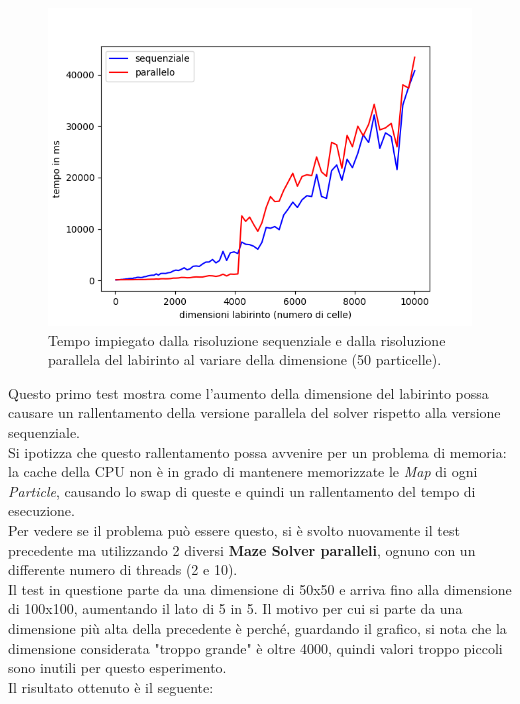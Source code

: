 \documentclass[10pt,twocolumn,letterpaper]{article}
\begin{document}
\begin{figure}[H]
\includegraphics[width=1.1\linewidth]{test/dimTest/result.png}
\caption{\small Tempo impiegato dalla risoluzione sequenziale e dalla risoluzione parallela del labirinto al variare della dimensione (50 particelle).}
\label{t1}
\end{figure}

Questo primo test mostra come l'aumento della dimensione del labirinto possa causare un rallentamento della versione parallela del solver rispetto alla versione sequenziale.\\
Si ipotizza che questo rallentamento possa avvenire per un problema di memoria: la cache della CPU non è in grado di mantenere memorizzate le \textit{Map} di ogni \textit{Particle}, causando lo swap di queste e quindi un rallentamento del tempo di esecuzione.\\
Per vedere se il problema può essere questo, si è svolto nuovamente il test precedente ma utilizzando 2 diversi \textbf{Maze Solver paralleli}, ognuno con un differente numero di threads (2 e 10).\\
Il test in questione parte da una dimensione di 50x50 e arriva fino alla dimensione di 100x100, aumentando il lato di 5 in 5. Il motivo per cui si parte da una dimensione più alta della precedente è perché, guardando il grafico, si nota che la dimensione considerata "troppo grande" è oltre 4000, quindi valori troppo piccoli sono inutili per questo esperimento.\\
Il risultato ottenuto è il seguente:
\end{document}
